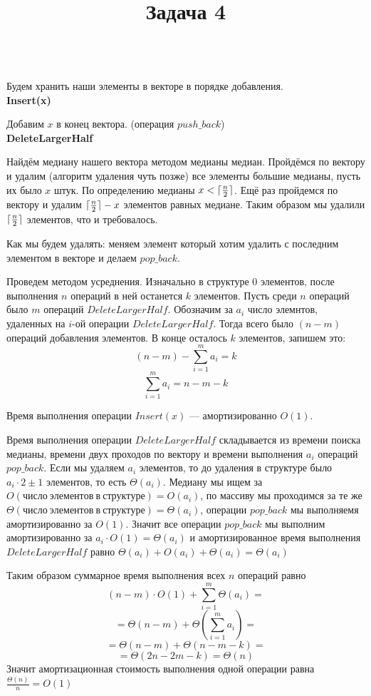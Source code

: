 \documentclass{article}
\title{Задача 4}
\date{}
\DeclarePairedDelimiter\ceil{\lceil}{\rceil}
\begin{document}
\maketitle
\LARGE

{\\}
Будем хранить наши элементы в векторе в порядке добавления.\\
\textbf{Insert(x)}

Добавим $x$ в конец вектора. (операция $push\_back$)\\
\textbf{DeleteLargerHalf}

Найдём медиану нашего вектора методом медианы медиан. Пройдёмся по вектору и удалим (алгоритм удаления чуть позже) все элементы большие медианы, пусть их было $x$ штук. По определению медианы $x<\ceil{\frac{n}{2}}$. Ещё раз пройдемся по вектору и удалим $\ceil{\frac{n}{2}}-x$ элементов равных медиане. Таким образом мы удалили $\ceil{\frac{n}{2}}$ элементов, что и требовалось. 

Как мы будем удалять: меняем элемент который хотим удалить с последним элементом в векторе и делаем $pop\_back$.

\newpage
Проведем {} методом усреднения. Изначально в структуре $0$ элементов, после выполнения $n$ операций в ней останется $k$ элементов. Пусть среди $n$ операций было $m$ операций $DeleteLargerHalf$. Обозначим за $a_i$ число элемнтов, удаленных на $i$-ой операции $DeleteLargerHalf$. Тогда всего было $(n-m)$ операций добавления элементов. В конце осталось $k$ элементов, запишем это:
$$(n-m)-\sum_{i=1}^{m}a_i=k$$
$$\sum_{i=1}^{m}a_i=n-m-k$$

Время выполнения операции $Insert(x)$ --- амортизированно $O(1)$. 

Время выполнения операции $DeleteLargerHalf$ складывается из времени поиска медианы, времени двух проходов по вектору и времени выполнения $a_i$ операций $pop\_back$. Если мы удаляем $a_i$ элементов, то до удаления в структуре было $a_i\cdot2\pm1$ элементов, то есть $\Theta(a_i)$. Медиану мы ищем за $O(число\ элементов\ в\ структуре)=O(a_i)$, по массиву мы проходимся за те же \\$\Theta(число\ элементов\ в\ структуре)=\Theta(a_i)$, операции $pop\_back$ мы выполняемя амортизированно за $O(1)$. Значит все операции  $pop\_back$ мы выполним амортизированно за $a_i\cdot O(1)=\Theta(a_i)$ и амортизированное время выполнения $DeleteLargerHalf$ равно $\Theta(a_i)+O(a_i)+\Theta(a_i)=\Theta(a_i)$

Таким образом суммарное время выполнения всех $n$ операций равно 
$$(n-m)\cdot O(1)+\sum_{i=1}^{m}\Theta(a_i)=$$
$$=\Theta(n-m)+\Theta(\sum_{i=1}^{m}a_i)=$$
$$=\Theta(n-m)+\Theta(n-m-k)=$$
$$=\Theta(2n-2m-k)=\Theta(n)$$
Значит амортизационная стоимость выполнения одной операции равна $\frac{\Theta(n)}{n}=O(1)$
\end{document}
